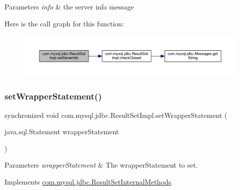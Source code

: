 \begin{DoxyParams}{Parameters}
{\em info} & the server info message \\
\hline
\end{DoxyParams}
Here is the call graph for this function\+:
\nopagebreak
\begin{figure}[H]
\begin{center}
\leavevmode
\includegraphics[width=350pt]{classcom_1_1mysql_1_1jdbc_1_1_result_set_impl_aeed7375a7fd914946480d5d1e51efa68_cgraph}
\end{center}
\end{figure}
\mbox{\label{classcom_1_1mysql_1_1jdbc_1_1_result_set_impl_af945ea2fe5463f6d71b3af855fcf9dd5}} 
\subsubsection{\texorpdfstring{set\+Wrapper\+Statement()}{setWrapperStatement()}}
{\footnotesize\ttfamily synchronized void com.\+mysql.\+jdbc.\+Result\+Set\+Impl.\+set\+Wrapper\+Statement (\begin{DoxyParamCaption}\item[{java.\+sql.\+Statement}]{wrapper\+Statement }\end{DoxyParamCaption})}


\begin{DoxyParams}{Parameters}
{\em wrapper\+Statement} & The wrapper\+Statement to set. \\
\hline
\end{DoxyParams}


Implements \mbox{\hyperlink{interfacecom_1_1mysql_1_1jdbc_1_1_result_set_internal_methods_ac1fc0056e58d1648fa493b97c8a658fc}{com.\+mysql.\+jdbc.\+Result\+Set\+Internal\+Methods}}.

